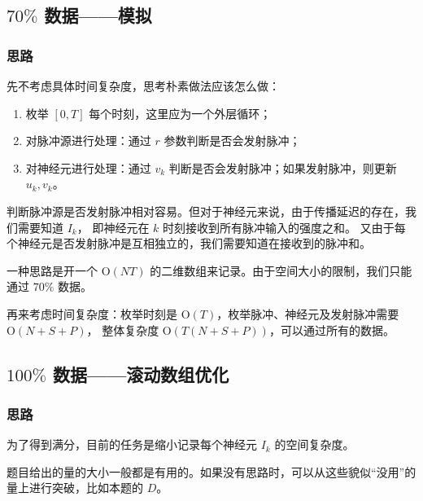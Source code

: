 
% 

\subsection{\texorpdfstring{$70\%$}{70\%} 数据——模拟}

\subsubsection{思路}

先不考虑具体时间复杂度，思考朴素做法应该怎么做：

\begin{enumerate}
    \item 枚举 $[0,T]$ 每个时刻，这里应为一个外层循环；
    \item 对脉冲源进行处理：通过 $r$ 参数判断是否会发射脉冲；
    \item 对神经元进行处理：通过 $v_k$ 判断是否会发射脉冲；如果发射脉冲，则更新 $u_k,v_k$。
\end{enumerate}

判断脉冲源是否发射脉冲相对容易。但对于神经元来说，由于传播延迟的存在，我们需要知道 $I_k$，
即神经元在 $k$ 时刻接收到所有脉冲输入的强度之和。
又由于每个神经元是否发射脉冲是互相独立的，我们需要知道{}在{}接收到的脉冲和。

一种思路是开一个 $\mathrm{O}(NT)$ 的二维数组来记录。由于空间大小的限制，我们只能通过 $70\%$ 数据。

再来考虑时间复杂度：枚举时刻是 $\mathrm{O}(T)$，枚举脉冲、神经元及发射脉冲需要 $\mathrm{O}(N+S+P)$，
整体复杂度 $\mathrm{O}(T(N+S+P))$，可以通过所有的数据。

\subsection{\texorpdfstring{$100\%$}{100\%} 数据——滚动数组优化}

\subsubsection{思路}

为了得到满分，目前的任务是缩小记录每个神经元 $I_k$ 的空间复杂度。

\begin{note}
    题目给出的量的大小一般都是有用的。如果没有思路时，可以从这些貌似“没用”的量上进行突破，比如本题的 $D$。
\end{note}

